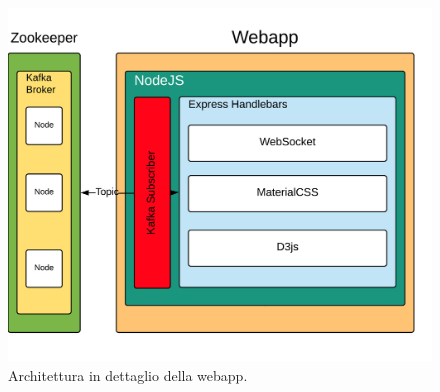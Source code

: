 \begin{figure}[H]
	\centering
	\includegraphics[width=\textwidth]{images/webApp.png}
	\caption{Architettura in dettaglio della webapp.}
	\label{fig:webAppArchitetture}
\end{figure}